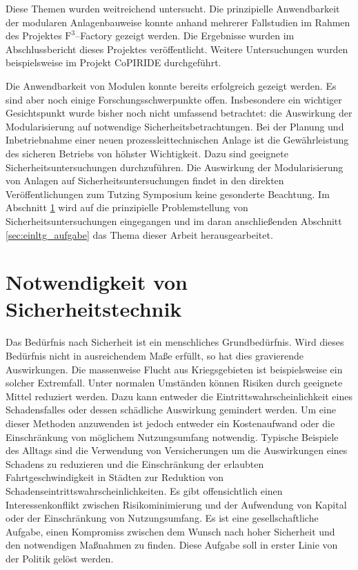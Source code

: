 Diese Themen wurden weitreichend untersucht. Die prinzipielle Anwendbarkeit der modularen Anlagenbauweise konnte anhand mehrerer Fallstudien im Rahmen des Projektes $\text{F}^{3}$--Factory gezeigt werden. Die Ergebnisse wurden im Abschlussbericht dieses Projektes \cite{f3_2014} ver\"offentlicht. \linebreak
Weitere Untersuchungen wurden beispielsweise im Projekt CoPIRIDE \cite{copiride_2014} durchgef\"uhrt.

Die Anwendbarkeit von Modulen konnte bereits erfolgreich gezeigt werden. Es sind aber noch einige Forschungsschwerpunkte offen. Insbesondere ein wichtiger Gesichtspunkt wurde bisher noch nicht umfassend betrachtet: die Auswirkung der Modularisierung auf notwendige Sicherheitsbetrachtungen. \linebreak
Bei der Planung und Inbetriebnahme einer neuen prozessleittechnischen Anlage ist die Gew\"ahrleistung des sicheren Betriebs von h\"ohster Wichtigkeit. Dazu sind geeignete Sicherheitsuntersuchungen durchzuf\"uhren. Die Auswirkung der Modularisierung von Anlagen auf Sicherheitsuntersuchungen findet in den direkten Ver\"offentlichungen zum Tutzing Symposium keine gesonderte Beachtung. Im Abschnitt \ref{sec:einltg_sicherheitstechnik} wird auf die prinzipielle Problemstellung von Sicherheitsuntersuchungen eingegangen und im daran anschlie\ss{}enden Abschnitt \ref{sec:einltg_aufgabe} das Thema dieser Arbeit herausgearbeitet. 

\section{Notwendigkeit von Sicherheitstechnik} \label{sec:einltg_sicherheitstechnik}
Das Bed\"urfnis nach Sicherheit ist ein menschliches Grundbed\"urfnis. Wird dieses Bed\"urfnis nicht in ausreichendem Ma\ss{}e erf\"ullt, so hat dies gravierende Auswirkungen. Die massenweise Flucht aus Kriegsgebieten ist beispielsweise ein solcher Extremfall. \linebreak
Unter normalen Umst\"anden k\"onnen Risiken durch geeignete Mittel reduziert werden. Dazu kann entweder die Eintrittswahrscheinlichkeit eines Schadensfalles oder dessen sch\"adliche Auswirkung gemindert werden. Um eine dieser Methoden anzuwenden ist jedoch entweder ein Kostenaufwand oder die Einschr\"ankung von m\"oglichem Nutzungsumfang notwendig. Typische Beispiele des Alltags sind die Verwendung von Versicherungen um die Auswirkungen eines Schadens zu reduzieren und die Einschr\"ankung der erlaubten Fahrtgeschwindigkeit in St\"adten zur Reduktion von Schadenseintrittswahrscheinlichkeiten. Es gibt offensichtlich einen Interessenkonflikt zwischen Risikominimierung und der Aufwendung von Kapital oder der Einschr\"ankung von Nutzungsumfang. \linebreak
Es ist eine gesellschaftliche Aufgabe, einen Kompromiss zwischen dem Wunsch nach hoher Sicherheit und den notwendigen Ma\ss{}nahmen zu finden. Diese Aufgabe soll in erster Linie von der Politik gel\"ost werden.

